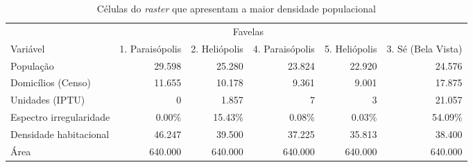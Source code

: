 \begingroup
\fontsize{9.8pt}{11.7pt}\selectfont
\begin{longtable}{lrrrrr} 
\caption{Células do \textit{raster} que apresentam a maior densidade populacional}
\label{tab:top5}\\
\toprule
 & \multicolumn{4}{c}{Favelas} &  \\ 
\cmidrule(lr){2-5}
Variável & 1. Paraisópolis & 2. Heliópolis  & 4. Paraisópolis & 5. Heliópolis & 3. Sé (Bela Vista) \\ 
\midrule\addlinespace[2.5pt]
População & 29.598 & 25.280 & 23.824 & 22.920 & 24.576 \\ 
Domicílios (Censo) & 11.655 & 10.178 & 9.361 & 9.001 & 17.875 \\ 
Unidades (IPTU) & 0 & 1.857 & 7 & 3 & 21.057 \\ 
Espectro irregularidade & 0.00\% & 15.43\% & 0.08\% & 0.03\% & 54.09\% \\ 
Densidade habitacional & 46.247 & 39.500 & 37.225 & 35.813 & 38.400 \\ 
Área & 640.000 & 640.000 & 640.000 & 640.000 & 640.000 \\ 
\bottomrule
\end{longtable}
\endgroup

